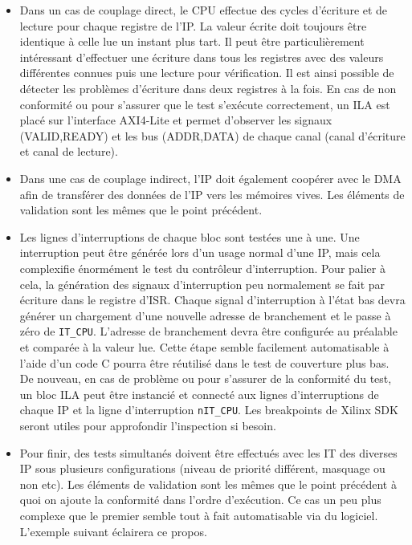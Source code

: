 \begin{itemize}
	\item Dans un cas de couplage direct, le CPU effectue des cycles d'écriture et de lecture pour chaque registre de l'IP.
	La valeur écrite doit toujours être identique à celle lue un instant plus tart.
	Il peut être particulièrement intéressant d'effectuer une écriture dans tous les registres avec des valeurs différentes connues puis une lecture pour vérification.
	Il est ainsi possible de détecter les problèmes d'écriture dans deux registres à la fois.
	En cas de non conformité ou pour s'assurer que le test s'exécute correctement, un ILA est placé sur l'interface AXI4-Lite et permet d'observer les signaux (VALID,READY) et les bus (ADDR,DATA) de chaque canal (canal d'écriture et canal de lecture).
	\item Dans une cas de couplage indirect, l'IP doit également coopérer avec le DMA afin de transférer des données de l'IP vers les mémoires vives.
	Les éléments de validation sont les mêmes que le point précédent.
	\item Les lignes d'interruptions de chaque bloc sont testées une à une.
	Une interruption peut être générée lors d'un usage normal d'une IP, mais cela complexifie énormément le test du contrôleur d'interruption.
	Pour palier à cela, la génération des signaux d'interruption peu normalement se fait par écriture dans le registre d'ISR.
	Chaque signal d'interruption à l'état bas devra générer un chargement d'une nouvelle adresse de branchement et le passe à zéro de \texttt{IT\_CPU}.
	L'adresse de branchement devra être configurée au préalable et comparée à la valeur lue.
	Cette étape semble facilement automatisable à l'aide d'un code C pourra être réutilisé dans le test de couverture plus bas.
	De nouveau, en cas de problème ou pour s'assurer de la conformité du test, un bloc ILA peut être instancié et connecté aux lignes d'interruptions de chaque IP et la ligne d'interruption \texttt{nIT\_CPU}.
	Les breakpoints de Xilinx SDK seront utiles pour approfondir l'inspection si besoin.
	\item Pour finir, des tests simultanés doivent être effectués avec les IT des diverses IP sous plusieurs configurations (niveau de priorité différent, masquage ou non etc).
	Les éléments de validation sont les mêmes que le point précédent à quoi on ajoute la conformité dans l'ordre d'exécution.
	Ce cas un peu plus complexe que le premier semble tout à fait automatisable via du logiciel.
	L'exemple suivant éclairera ce propos. 
	
\end{itemize}

